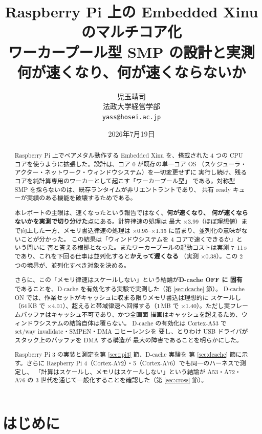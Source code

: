 \documentclass[11pt,a4paper]{article}
\title{\textbf{Raspberry Pi 上の Embedded Xinu のマルチコア化}\\[2mm]
       \large ワーカープール型 SMP の設計と実測\\[1mm]
       \normalsize 何が速くなり、何が速くならないか}
\author{児玉靖司\\\small 法政大学経営学部\\\small \texttt{yass@hosei.ac.jp}}
\date{2026年7月19日}
\newcommand{\spd}[1]{$\times$#1}
\begin{document}
\maketitle

\begin{abstract}
\noindent
Raspberry Pi 上でベアメタル動作する Embedded Xinu を、搭載された 4 つの
CPU コアを使うように拡張した。設計は、コア 0 が既存の単一コア OS
（スケジューラ・アクター・ネットワーク・ウィンドウシステム）を一切変更せずに
実行し続け、残るコアを純計算専用のワーカーとして起こす「ワーカープール型」
である。対称型 SMP を採らないのは、既存ランタイムが非リエントラントであり、
共有 ready キューが実績のある機能を破壊するためである。

本レポートの主眼は、速くなったという報告ではなく、\textbf{何が速くなり、
何が速くならないかを実測で切り分けた}点にある。計算律速の処理は
最大 \spd{3.99}（ほぼ理想値）まで向上した一方、メモリ書込律速の処理は
\spd{0.95}--\spd{1.35} に留まり、並列化の意味がないことが分かった。
この結果は「ウィンドウシステムを 4 コアで速くできるか」という問いに
否と答える根拠となった。またワーカープールの起動コストは実測 7--11\,\textmu s
であり、これを下回る仕事は並列化すると\textbf{かえって遅くなる}
（実測 \spd{0.38}）。この 2 つの境界が、並列化すべき対象を決める。

さらに、この「メモリ律速はスケールしない」という結論が\textbf{D-cache OFF に
固有}であることを、D-cache を有効化する実験で実測した（第 \ref{sec:dcache} 節）。
D-cache ON では、作業セットがキャッシュに収まる限りメモリ書込は理想的に
スケールし（64\,KB で \spd{4.01}）、超えると帯域律速へ回帰する（1\,MB で
\spd{1.40}）。ただし実フレームバッファはキャッシュ不可であり、かつ全画面
描画はキャッシュを超えるため、ウィンドウシステムの結論自体は覆らない。
D-cache の有効化は Cortex-A53 で set/way invalidate・SMPEN・DMA コヒーレンシを
要し、とりわけ USB ドライバがスタック上のバッファを DMA する構造が
最大の障害であることを明らかにした。

Raspberry Pi 3 の実装と測定を第 \ref{sec:rpi3} 節、D-cache 実験を
第 \ref{sec:dcache} 節に示す。さらに Raspberry Pi 4（Cortex-A72）・5（Cortex-A76）でも同一のハーネスで測定し、
「計算はスケールし、メモリはスケールしない」という結論が A53・A72・A76 の
3 世代を通じて一般化することを確認した（第 \ref{sec:cross} 節）。
\end{abstract}

\tableofcontents
\newpage

\section{はじめに}
\end{document}
